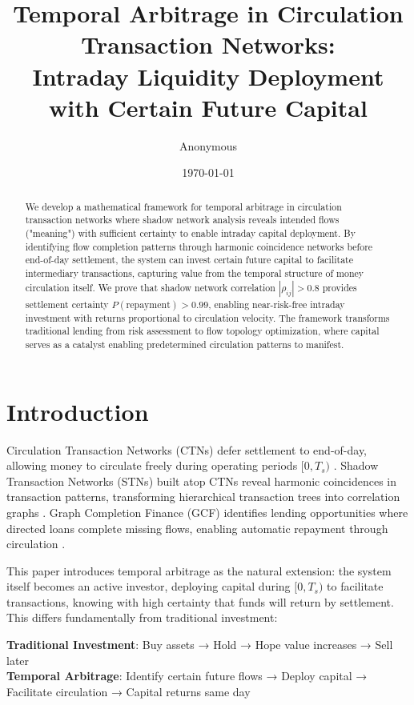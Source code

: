 \documentclass[12pt]{article}
\title{Temporal Arbitrage in Circulation Transaction Networks:\\
Intraday Liquidity Deployment with Certain Future Capital}
\author{Anonymous}
\date{\today}
\begin{document}
\maketitle

\begin{abstract}
We develop a mathematical framework for temporal arbitrage in circulation transaction networks where shadow network analysis reveals intended flows ("meaning") with sufficient certainty to enable intraday capital deployment. By identifying flow completion patterns through harmonic coincidence networks before end-of-day settlement, the system can invest certain future capital to facilitate intermediary transactions, capturing value from the temporal structure of money circulation itself. We prove that shadow network correlation $|\rho_{ij}| > 0.8$ provides settlement certainty $P(\text{repayment}) > 0.99$, enabling near-risk-free intraday investment with returns proportional to circulation velocity. The framework transforms traditional lending from risk assessment to flow topology optimization, where capital serves as a catalyst enabling predetermined circulation patterns to manifest.
\end{abstract}

\section{Introduction}

Circulation Transaction Networks (CTNs) defer settlement to end-of-day, allowing money to circulate freely during operating periods $[0, T_s)$ \cite{kirchhoff1845laws}. Shadow Transaction Networks (STNs) built atop CTNs reveal harmonic coincidences in transaction patterns, transforming hierarchical transaction trees into correlation graphs \cite{shannon1948mathematical}. Graph Completion Finance (GCF) identifies lending opportunities where directed loans complete missing flows, enabling automatic repayment through circulation \cite{cover2006elements}.

This paper introduces temporal arbitrage as the natural extension: the system itself becomes an active investor, deploying capital during $[0, T_s)$ to facilitate transactions, knowing with high certainty that funds will return by settlement. This differs fundamentally from traditional investment:

\textbf{Traditional Investment}: Buy assets → Hold → Hope value increases → Sell later\\
\textbf{Temporal Arbitrage}: Identify certain future flows → Deploy capital → Facilitate circulation → Capital returns same day
\end{document}
